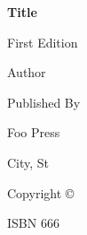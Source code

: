 \setcounter{page}{-1}

\thispagestyle{empty}

\begin{figure}[p] %
\end{figure}
\restoregeometry %

\thispagestyle{empty}

\frontmatter
\begin{titlepage}
    \thispagestyle{empty}
    \begin{center}
        \LARGE
        \textbf{Title}
        
        \vspace*{1.5in}
        \Large
        First Edition
        
        \vspace*{1.5in}
        \Large
        Author
        
        \vspace*{\fill}
    \end{center}
    \newpage
    \thispagestyle{empty}
    \begin{center}
        \vspace*{\fill}
        Published By
        
        Foo Press
        
        City, St
        
        Copyright \copyright{}

        ISBN 666
    \end{center}
\end{titlepage}

\thispagestyle{empty}
\tableofcontents
\thispagestyle{empty}

